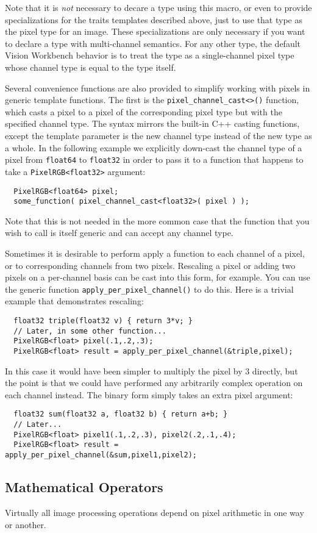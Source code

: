 Note that it is {\it not} necessary to decare a type using this macro,
or even to provide specializations for the traits templates described
above, just to use that type as the pixel type for an image.  These
specializations are only necessary if you want to declare a type with
multi-channel semantics.  For any other type, the default Vision
Workbench behavior is to treat the type as a single-channel pixel type
whose channel type is equal to the type itself.

Several convenience functions are also provided to simplify working
with pixels in generic template functions.  The first is the
\verb#pixel_channel_cast<>()# function, which casts a pixel to a pixel
of the corresponding pixel type but with the specified channel type.
The syntax mirrors the built-in C++ casting functions, except the
template parameter is the new channel type instead of the new type as
a whole.  In the following example we explicitly down-cast the channel
type of a pixel from \verb#float64# to \verb#float32# in order to pass
it to a function that happens to take a \verb#PixelRGB<float32>#
argument:
\begin{verbatim}
  PixelRGB<float64> pixel;
  some_function( pixel_channel_cast<float32>( pixel ) );
\end{verbatim}
Note that this is not needed in the more common case that the 
function that you wish to call is itself generic and can accept 
any channel type.

Sometimes it is desirable to perform apply a function to each channel
of a pixel, or to corresponding channels from two pixels.  Rescaling a
pixel or adding two pixels on a per-channel basis can be cast into
this form, for example.  You can use the generic function
\verb#apply_per_pixel_channel()# to do this.  Here is a trivial 
example that demonstrates rescaling:
\begin{verbatim}
  float32 triple(float32 v) { return 3*v; }
  // Later, in some other function...
  PixelRGB<float> pixel(.1,.2,.3);
  PixelRGB<float> result = apply_per_pixel_channel(&triple,pixel);
\end{verbatim}
In this case it would have been simpler to multiply the pixel 
by $3$ directly, but the point is that we could have performed 
any arbitrarily complex operation on each channel instead.
The binary form simply takes an extra pixel argument:
\begin{verbatim}
  float32 sum(float32 a, float32 b) { return a+b; }
  // Later...
  PixelRGB<float> pixel1(.1,.2,.3), pixel2(.2,.1,.4);
  PixelRGB<float> result = apply_per_pixel_channel(&sum,pixel1,pixel2);
\end{verbatim}

\subsection{Mathematical Operators}
Virtually all image processing operations depend on pixel 
arithmetic in one way or another.
